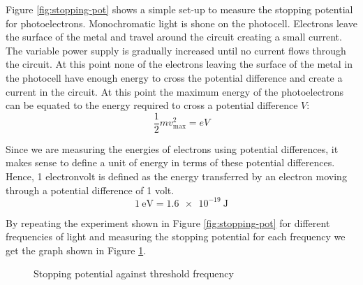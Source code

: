 \documentclass[revision-guide.tex]{subfiles}
\begin{document}
Figure \ref{fig:stopping-pot} shows a simple set-up to measure the stopping potential for photoelectrons. Monochromatic light is shone on the photocell. Electrons leave the surface of the metal and travel around the circuit creating a small current. The variable power supply is gradually increased until no current flows through the circuit. At this point none of the electrons leaving the surface of the metal in the photocell have enough energy to cross the potential difference and create a current in the circuit. At this point the maximum energy of the photoelectrons can be equated to the energy required to cross a potential difference $V$:
\begin{equation}\label{eqn:photoelectron-stopping-pot}
  \frac{1}{2}mv_{\text{max}}^2 = eV
\end{equation}

Since we are measuring the energies of electrons using potential differences, it makes sense to define a unit of energy in terms of these potential differences. Hence, 1 electronvolt is defined as the energy transferred by an electron moving through a potential difference of 1 volt.
\begin{equation}
  \SI{1}{\electronvolt} = \SI{1.6e-19}{\joule}
\end{equation}


By repeating the experiment shown in Figure \ref{fig:stopping-pot} for different frequencies of light and measuring the stopping potential for each frequency we get the graph shown in Figure \ref{fig:milikan-results}.

\begin{figure}[ht]
  \begin{center}
  \end{center}
  \caption{Stopping potential against threshold frequency}
  \label{fig:milikan-results}
\end{figure}
\end{document}
